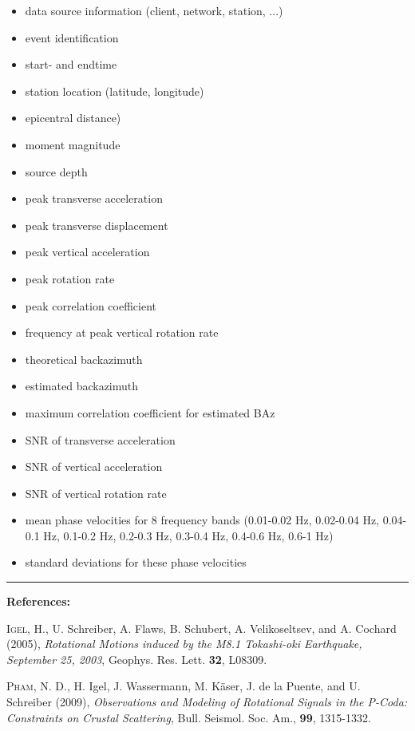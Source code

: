 \documentclass[a4paper,10pt]{article}
\begin{document}
\begin{itemize}
	\item data source information (client, network, station, ...)
	\item event identification
	\item start- and endtime
	\item station location (latitude, longitude)
	\item epicentral distance)
	\item moment magnitude
	\item source depth
	\item peak transverse acceleration
	\item peak transverse displacement
	\item peak vertical acceleration
	\item peak rotation rate
	\item peak correlation coefficient
	\item frequency at peak vertical rotation rate
	\item theoretical backazimuth
	\item estimated backazimuth
	\item maximum correlation coefficient for estimated BAz
	\item SNR of transverse acceleration
	\item SNR of vertical acceleration
	\item SNR of vertical rotation rate
	\item mean phase velocities for 8 frequency bands  (0.01-0.02  Hz,  0.02-0.04  Hz,  0.04-0.1  Hz,  0.1-0.2  Hz, 0.2-0.3 Hz, 0.3-0.4 Hz, 0.4-0.6 Hz, 0.6-1 Hz)
	\item standard deviations for these phase velocities
\end{itemize}

\vspace{5cm}
\hrule
\textbf{References:}

\textsc{Igel}, H., U. Schreiber, A. Flaws, B. Schubert, A. Velikoseltsev, and A. Cochard (2005), 
\textit{Rotational Motions induced by the M8.1 Tokashi-oki Earthquake, September 25, 2003}, Geophys.  Res.  Lett. \textbf{32}, L08309.


\textsc{Pham}, N. D., H. Igel, J. Wassermann, M. K{\"a}ser, J. de la Puente, and U. Schreiber (2009), \textit{Observations and Modeling of Rotational Signals in the P-Coda: Constraints on Crustal Scattering}, Bull.  Seismol.  Soc.  Am., \textbf{99}, 1315-1332.
\end{document}
